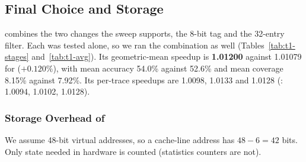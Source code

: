 \subsection{Final Choice and Storage}\label{sec:t1-final}
 combines the two changes the sweep supports, the 8-bit tag and the 32-entry filter. Each was tested
alone, so we ran the combination as well (Tables~\ref{tab:t1-stages} and~\ref{tab:t1-avg}). Its geometric-mean
speedup is \textbf{1.01200} against 1.01079 for  ($+0.120\%$), with mean accuracy 54.0\% against 52.6\%
and mean coverage 8.15\% against 7.92\%. Its per-trace speedups are 1.0098, 1.0133 and 1.0128 (:
1.0094, 1.0102, 1.0128).

\subsubsection{Storage Overhead of }
We assume 48-bit virtual addresses, so a cache-line address has $48-6 = 42$ bits. Only state needed in hardware is
counted (statistics counters are not).
